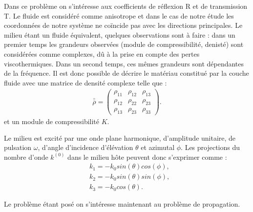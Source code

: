 \documentclass[twoside,openright]{report}
\begin{document}
    Dans ce problème on s'intéresse aux coefficients de réflexion R et de transmission T.
    Le fluide est considéré comme anisotrope et dans le cas de notre étude les coordonnées de notre système ne coïncide pas avec les directions principales. Le milieu étant un fluide équivalent, quelques observations sont à faire : dans un premier temps les grandeurs observées (module de compressibilité, denisté) sont considérées comme complexes, dû à la prise en compte des pertes viscothermiques. Dans un second temps, ces mêmes grandeurs sont dépendantes de la fréquence.
    Il est donc possible de décrire le matériau constitué par la couche fluide avec une matrice de densité complexe telle que :
    \begin{align}
    \bar{\bar{\rho}}=\begin{pmatrix}
    					\rho_{11} & \rho_{12} & \rho_{13} \\
                        \rho_{12} & \rho_{22} & \rho_{23} \\
                        \rho_{13} & \rho_{23} & \rho_{33}                       
    				 \end{pmatrix}.
    \end{align}
    et un module de compressibilité $K$.
    
    Le milieu est excité par une onde plane harmonique, d'amplitude unitaire, de pulsation $\omega$, d'angle d'incidence d'élévation $\theta$ et azimutal $\phi$. Les projections du nombre d'onde $k^{(0)}$ dans le milieu hôte peuvent donc s'exprimer comme : 
    \begin{align}
    &k_1=-k_0 sin(\theta) cos(\phi),\label{k1} \\
    &k_2=-k_0 sin(\theta) sin(\phi),\label{k2} \\
    &k_3= -k_0 cos(\theta).\label{k3}
    \end{align}
        
        Le problème étant posé on s'intéresse maintenant au problème de propagation.
        
\end{document}
